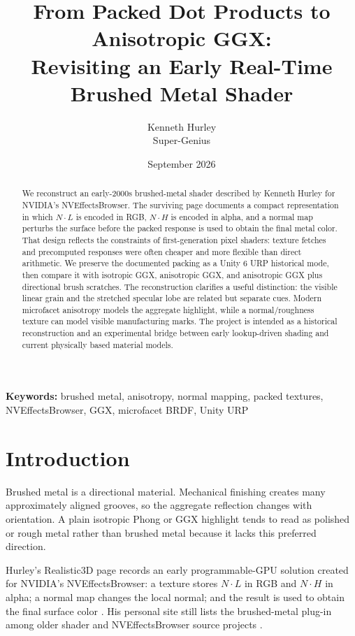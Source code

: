 \documentclass[10pt]{article}
\title{From Packed Dot Products to Anisotropic GGX:\\Revisiting an Early Real-Time Brushed Metal Shader}
\author{Kenneth Hurley\\\small Super-Genius}
\date{September 2026}
\begin{document}
\maketitle

\begin{abstract}
We reconstruct an early-2000s brushed-metal shader described by Kenneth Hurley for NVIDIA's NVEffectsBrowser. The surviving page documents a compact representation in which $N\cdot L$ is encoded in RGB, $N\cdot H$ is encoded in alpha, and a normal map perturbs the surface before the packed response is used to obtain the final metal color. That design reflects the constraints of first-generation pixel shaders: texture fetches and precomputed responses were often cheaper and more flexible than direct arithmetic. We preserve the documented packing as a Unity 6 URP historical mode, then compare it with isotropic GGX, anisotropic GGX, and anisotropic GGX plus directional brush scratches. The reconstruction clarifies a useful distinction: the visible linear grain and the stretched specular lobe are related but separate cues. Modern microfacet anisotropy models the aggregate highlight, while a normal/roughness texture can model visible manufacturing marks. The project is intended as a historical reconstruction and an experimental bridge between early lookup-driven shading and current physically based material models.
\end{abstract}

\textbf{Keywords:} brushed metal, anisotropy, normal mapping, packed textures, NVEffectsBrowser, GGX, microfacet BRDF, Unity URP

\section{Introduction}
Brushed metal is a directional material. Mechanical finishing creates many approximately aligned grooves, so the aggregate reflection changes with orientation. A plain isotropic Phong or GGX highlight tends to read as polished or rough metal rather than brushed metal because it lacks this preferred direction.

Hurley's Realistic3D page records an early programmable-GPU solution created for NVIDIA's NVEffectsBrowser: a texture stores $N\cdot L$ in RGB and $N\cdot H$ in alpha; a normal map changes the local normal; and the result is used to obtain the final surface color \cite{hurleybrushed}. His personal site still lists the brushed-metal plug-in among older shader and NVEffectsBrowser source projects \cite{hurleypubs}.
\end{document}
